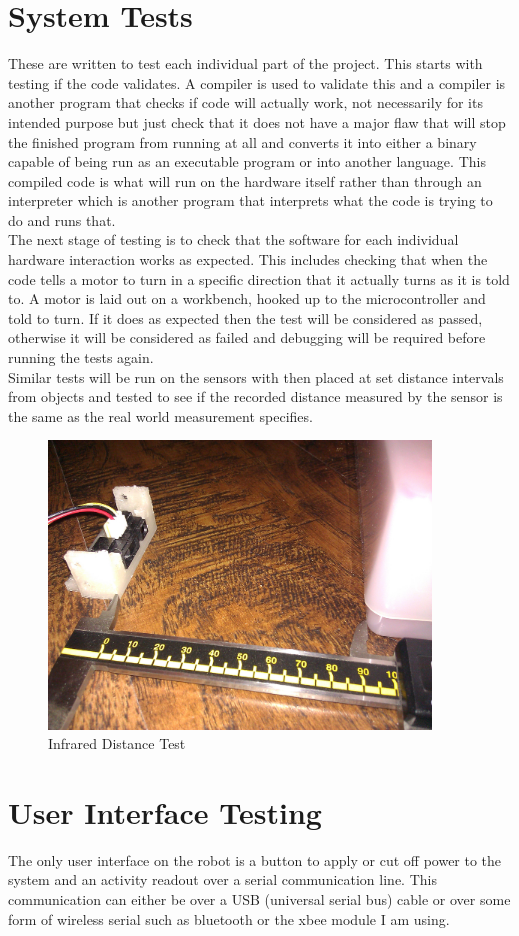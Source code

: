 \section{System Tests}
These are written to test each individual part of the project.  This starts with testing if the code validates.  A compiler is used to validate this and a compiler is another program that checks if code will actually work, not necessarily for its intended purpose but just check that it does not have a major flaw that will stop the finished program from running at all and converts it into either a binary capable of being run as an executable program or into another language.  This compiled code is what will run on the hardware itself rather than through an interpreter which is another program that interprets what the code is trying to do and runs that.
\\The next stage of testing is to check that the software for each individual hardware interaction works as expected.  This includes checking that when the code tells a motor to turn in a specific direction that it actually turns as it is told to.  A motor is laid out on a workbench, hooked up to the microcontroller and told to turn.  If it does as expected then the test will be considered as passed, otherwise it will be considered as failed and debugging will be required before running the tests again.
\\Similar tests will be run on the sensors with then placed at set distance intervals from objects and tested to see if the recorded distance measured by the sensor is the same as the real world measurement specifies.
\begin{figure}[h]
\centering
        \includegraphics[width=4.0in] {Images/ir-measure-2.jpg}
        \caption{Infrared Distance Test}
        \label{Infrared Distance Test}
\end{figure}
\section{User Interface Testing}
The only user interface on the robot is a button to apply or cut off power to the system and an activity readout over a serial communication line.  This communication can either be over a USB (universal serial bus) cable or over some form of wireless serial such as bluetooth or the xbee module I am using.


